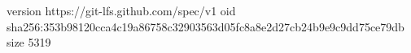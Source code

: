 version https://git-lfs.github.com/spec/v1
oid sha256:353b98120cca4c19a86758c32903563d05fc8a8e2d27cb24b9e9c9dd75ce79db
size 5319
